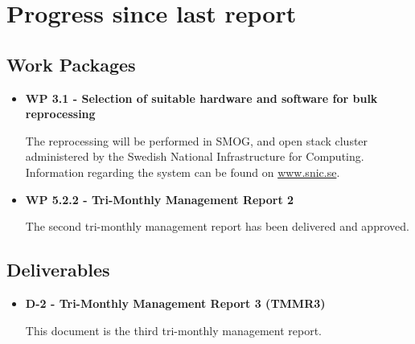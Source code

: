 \chapter{Progress since last report}
\label{chapter:progress}


\section{Work Packages}

\begin{itemize}

\item{\bf WP 3.1 - Selection of suitable hardware and software for bulk reprocessing}

The reprocessing will be performed in SMOG, and open stack cluster administered by the Swedish National Infrastructure for Computing. Information regarding the system can be found on \href{www.snic.se}{www.snic.se}. 

\item{\bf WP 5.2.2 - Tri-Monthly Management Report 2}

The second tri-monthly management report has been delivered and approved.

\end{itemize}



\section{Deliverables}

\begin{itemize}

\item{\bf D-2 - Tri-Monthly Management Report 3 (TMMR3)}

This document is the third tri-monthly management report.

\end{itemize}

